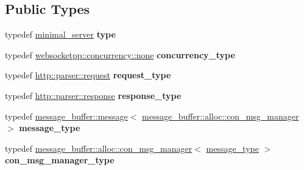 \subsection*{Public Types}
\begin{DoxyCompactItemize}
\item 
typedef \hyperlink{structwebsocketpp_1_1config_1_1minimal__server}{minimal\+\_\+server} {\bfseries type}\hypertarget{structwebsocketpp_1_1config_1_1minimal__server_a2b417043c646c203ae97af495f5bc3b4}{}\label{structwebsocketpp_1_1config_1_1minimal__server_a2b417043c646c203ae97af495f5bc3b4}

\item 
typedef \hyperlink{classwebsocketpp_1_1concurrency_1_1none}{websocketpp\+::concurrency\+::none} {\bfseries concurrency\+\_\+type}\hypertarget{structwebsocketpp_1_1config_1_1minimal__server_a54e2bde35814bd82607f618aacd3ec88}{}\label{structwebsocketpp_1_1config_1_1minimal__server_a54e2bde35814bd82607f618aacd3ec88}

\item 
typedef \hyperlink{classwebsocketpp_1_1http_1_1parser_1_1request}{http\+::parser\+::request} {\bfseries request\+\_\+type}\hypertarget{structwebsocketpp_1_1config_1_1minimal__server_a7b07ee40c2b25c39fb8e333f969df8e3}{}\label{structwebsocketpp_1_1config_1_1minimal__server_a7b07ee40c2b25c39fb8e333f969df8e3}

\item 
typedef \hyperlink{classwebsocketpp_1_1http_1_1parser_1_1response}{http\+::parser\+::response} {\bfseries response\+\_\+type}\hypertarget{structwebsocketpp_1_1config_1_1minimal__server_a19b0c06176d183a59e47bfe065b132ff}{}\label{structwebsocketpp_1_1config_1_1minimal__server_a19b0c06176d183a59e47bfe065b132ff}

\item 
typedef \hyperlink{classwebsocketpp_1_1message__buffer_1_1message}{message\+\_\+buffer\+::message}$<$ \hyperlink{classwebsocketpp_1_1message__buffer_1_1alloc_1_1con__msg__manager}{message\+\_\+buffer\+::alloc\+::con\+\_\+msg\+\_\+manager} $>$ {\bfseries message\+\_\+type}\hypertarget{structwebsocketpp_1_1config_1_1minimal__server_aecd1340269c1429fe37f042ec4b3cfac}{}\label{structwebsocketpp_1_1config_1_1minimal__server_aecd1340269c1429fe37f042ec4b3cfac}

\item 
typedef \hyperlink{classwebsocketpp_1_1message__buffer_1_1alloc_1_1con__msg__manager}{message\+\_\+buffer\+::alloc\+::con\+\_\+msg\+\_\+manager}$<$ \hyperlink{classwebsocketpp_1_1message__buffer_1_1message}{message\+\_\+type} $>$ {\bfseries con\+\_\+msg\+\_\+manager\+\_\+type}\hypertarget{structwebsocketpp_1_1config_1_1minimal__server_a005ebd181cca0e5adb553146733870b5}{}\label{structwebsocketpp_1_1config_1_1minimal__server_a005ebd181cca0e5adb553146733870b5}


\end{DoxyCompactItemize}
